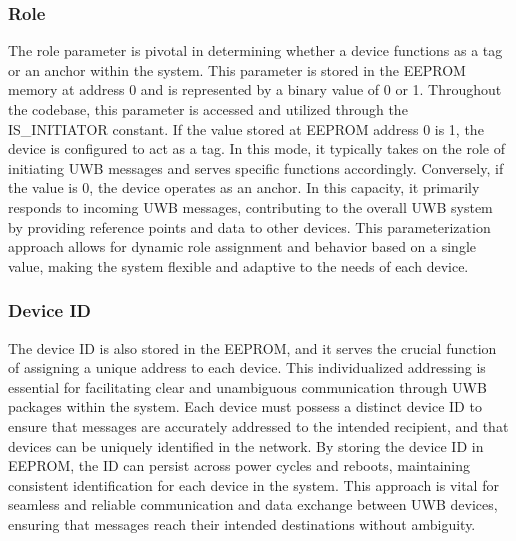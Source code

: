 \subsubsection{Role}
The role parameter is pivotal in determining whether a device functions as a tag or an anchor within the system. 
This parameter is stored in the EEPROM memory at address 0 and is represented by a binary value of 0 or 1. 
Throughout the codebase, this parameter is accessed and utilized through the IS\_INITIATOR constant.
\vspace{4pt}
\newline
If the value stored at EEPROM address 0 is 1, the device is configured to act as a tag. 
In this mode, it typically takes on the role of initiating UWB messages and serves specific functions accordingly. Conversely, if the value is 0, the device operates as an anchor. 
In this capacity, it primarily responds to incoming UWB messages, contributing to the overall UWB system by providing reference points and data to other devices.
\vspace{4pt}
\newline
This parameterization approach allows for dynamic role assignment and behavior based on a single value, making the system flexible and adaptive to the needs of each device.

\subsubsection{Device ID}
The device ID is also stored in the EEPROM, and it serves the crucial function of assigning a unique address to each device. 
This individualized addressing is essential for facilitating clear and unambiguous communication through UWB packages within the system. 
Each device must possess a distinct device ID to ensure that messages are accurately addressed to the intended recipient, and that devices can be uniquely identified in the network.
\vspace{4pt}
\newline
By storing the device ID in EEPROM, the ID can persist across power cycles and reboots, maintaining consistent identification for each device in the system. 
This approach is vital for seamless and reliable communication and data exchange between UWB devices, ensuring that messages reach their intended destinations without ambiguity.


